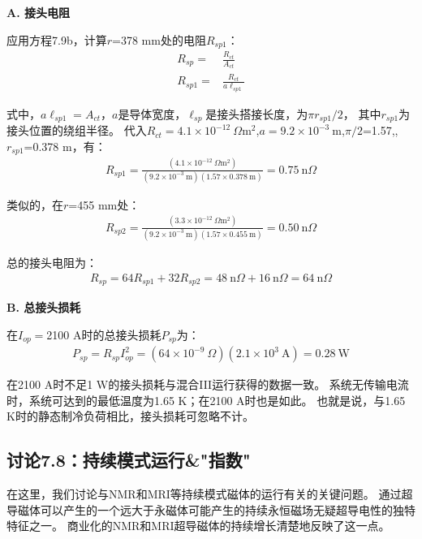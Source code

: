 \textbf{A. 接头电阻}

应用方程7.9b，计算$r$=378 mm处的电阻$R_{sp1}$：
\begin{align*}%
R_{sp}=&\frac{R_{ct}}{A_{ct}}\\\tag{7.9b}
R_{sp1}=&\frac{R_{ct}}{a\ell_{sp1}}
\end{align*}

式中，$a\ell_{sp1}=A_{ct}$，$a$是导体宽度，$\ell_{sp}$是接头搭接长度，为$\pi r_{sp1}/2$，
其中$r_{sp1}$为接头位置的绕组半径。
代入$R_{ct}=4.1\times 10^{-12}\ \Omega\mathrm{ m^2}$,$a=9.2\times 10^{-3}\ \mathrm{m}$,$\pi/2$=1.57,,$r_{sp1}$=0.378 m，有：
\begin{align*}%
R_{sp1}=\frac{(4.1\times 10^{-12}\ \Omega\mathrm{ m^2})}{(9.2\times 10^{-3}\ \mathrm{m})(1.57\times 0.378\ \mathrm{m})}=0.75\ \mathrm{n}\Omega
\end{align*}

类似的，在$r$=455 mm处：
\begin{align*}%
R_{sp2}=\frac{(3.3\times 10^{-12}\ \Omega \mathrm{m^2})}{(9.2\times 10^{-3}\ \mathrm{m})(1.57\times 0.455\ \mathrm{m})}=0.50\ \mathrm{n}\Omega
\end{align*}

总的接头电阻为：
\begin{align*}%
R_{sp}=64R_{sp1}+32R_{sp2}=48\ \mathrm{n}\Omega+16\ \mathrm{n}\Omega=64\ \mathrm{n}\Omega
\end{align*}

\textbf{B. 总接头损耗}

在$I_{op}=$2100 A时的总接头损耗$P_{sp}$为：
\begin{align*}%
P_{sp}=R_{sp}I_{op}^{2}=(64\times 10^{-9}\ \Omega)(2.1\times 10^3\ \mathrm{A})=0.28\ \mathrm{W}\tag{S8.5}
\end{align*}

在2100 A时不足1 W的接头损耗与混合III运行获得的数据一致。
系统无传输电流时，系统可达到的最低温度为1.65 K；在2100 A时也是如此。
也就是说，与1.65 K时的静态制冷负荷相比，接头损耗可忽略不计。


\subsection{讨论7.8：持续模式运行\&"指数"}
在这里，我们讨论与NMR和MRI等持续模式磁体的运行有关的关键问题。
通过超导磁体可以产生的一个远大于永磁体可能产生的持续永恒磁场无疑超导电性的独特特征之一。
商业化的NMR和MRI超导磁体的持续增长清楚地反映了这一点。

